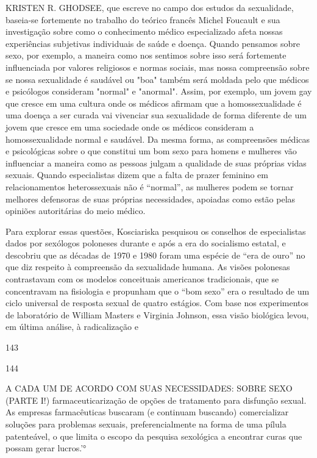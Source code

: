 KRISTEN R. GHODSEE, que escreve no campo dos estudos da sexualidade, baseia-se fortemente no trabalho do teórico francês Michel Foucault e sua investigação sobre como o conhecimento médico especializado afeta nossas experiências subjetivas individuais de saúde e doença. Quando pensamos sobre sexo, por exemplo, a maneira como nos sentimos sobre isso será fortemente influenciada por valores religiosos e normas sociais, mas nossa compreensão sobre se nossa sexualidade é saudável ou "boa" também será moldada pelo que médicos e psicólogos consideram "normal" e "anormal". Assim, por exemplo, um jovem gay que cresce em uma cultura onde os médicos afirmam que a homossexualidade é uma doença a ser curada vai vivenciar sua sexualidade de forma diferente de um jovem que cresce em uma sociedade onde os médicos consideram a homossexualidade normal e saudável. Da mesma forma, as compreensões médicas e psicológicas sobre o que constitui um bom sexo para homens e mulheres vão influenciar a maneira como as pessoas julgam a qualidade de suas próprias vidas sexuais. Quando especialistas dizem que a falta de prazer feminino em relacionamentos heterossexuais não é “normal”, as mulheres podem se tornar melhores defensoras de suas próprias necessidades, apoiadas como estão pelas opiniões autoritárias do meio médico.
 \par 
Para explorar essas questões, Kosciariska pesquisou os conselhos de especialistas dados por sexólogos poloneses durante e após a era do socialismo estatal, e descobriu que as décadas de 1970 e 1980 foram uma espécie de “era de ouro” no que diz respeito à compreensão da sexualidade humana. As visões polonesas contrastavam com os modelos conceituais americanos tradicionais, que se concentravam na fisiologia e propunham que o “bom sexo” era o resultado de um ciclo universal de resposta sexual de quatro estágios. Com base nos experimentos de laboratório de William Masters e Virginia Johnson, essa visão biológica levou, em última análise, à radicalização e
 \par 
143
 \par 
144
 \par 
A CADA UM DE ACORDO COM SUAS NECESSIDADES: SOBRE SEXO (PARTE I!) farmaceuticarização de opções de tratamento para disfunção sexual. As empresas farmacêuticas buscaram (e continuam buscando) comercializar soluções para problemas sexuais, preferencialmente na forma de uma pílula patenteável, o que limita o escopo da pesquisa sexológica a encontrar curas que possam gerar lucros.'°
 \par 
